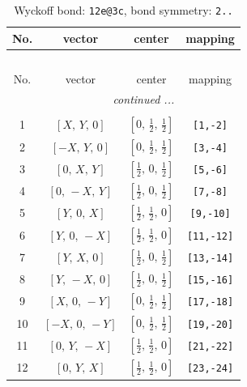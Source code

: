 \documentclass[fleqn,8pt]{jsarticle}
\begin{document}
\renewcommand{\arraystretch}{1.2}
\begin{longtable}{cccc}
\caption{Wyckoff bond: {\tt 12e@3c}, bond symmetry: {\tt 2..}}
 \\
 \hline \hline
No. & vector & center & mapping \\ \hline \endfirsthead

\multicolumn{3}{l}{\tablename\ \thetable{}} \\
 \hline \hline
No. & vector & center & mapping \\ \hline \endhead

 \hline \hline
\multicolumn{3}{r}{\footnotesize\it continued ...} \\ \endfoot

 \hline \hline
\multicolumn{3}{r}{} \\ \endlastfoot

1 & $\left[ X,\, Y,\, 0 \right]$ & $\left[ 0,\, \frac{1}{2},\, \frac{1}{2} \right]$ & {\tt [1,-2]} \\ \hline
2 & $\left[ - X,\, Y,\, 0 \right]$ & $\left[ 0,\, \frac{1}{2},\, \frac{1}{2} \right]$ & {\tt [3,-4]} \\ \hline
3 & $\left[ 0,\, X,\, Y \right]$ & $\left[ \frac{1}{2},\, 0,\, \frac{1}{2} \right]$ & {\tt [5,-6]} \\ \hline
4 & $\left[ 0,\, - X,\, Y \right]$ & $\left[ \frac{1}{2},\, 0,\, \frac{1}{2} \right]$ & {\tt [7,-8]} \\ \hline
5 & $\left[ Y,\, 0,\, X \right]$ & $\left[ \frac{1}{2},\, \frac{1}{2},\, 0 \right]$ & {\tt [9,-10]} \\ \hline
6 & $\left[ Y,\, 0,\, - X \right]$ & $\left[ \frac{1}{2},\, \frac{1}{2},\, 0 \right]$ & {\tt [11,-12]} \\ \hline
7 & $\left[ Y,\, X,\, 0 \right]$ & $\left[ \frac{1}{2},\, 0,\, \frac{1}{2} \right]$ & {\tt [13,-14]} \\ \hline
8 & $\left[ Y,\, - X,\, 0 \right]$ & $\left[ \frac{1}{2},\, 0,\, \frac{1}{2} \right]$ & {\tt [15,-16]} \\ \hline
9 & $\left[ X,\, 0,\, - Y \right]$ & $\left[ 0,\, \frac{1}{2},\, \frac{1}{2} \right]$ & {\tt [17,-18]} \\ \hline
10 & $\left[ - X,\, 0,\, - Y \right]$ & $\left[ 0,\, \frac{1}{2},\, \frac{1}{2} \right]$ & {\tt [19,-20]} \\ \hline
11 & $\left[ 0,\, Y,\, - X \right]$ & $\left[ \frac{1}{2},\, \frac{1}{2},\, 0 \right]$ & {\tt [21,-22]} \\ \hline
12 & $\left[ 0,\, Y,\, X \right]$ & $\left[ \frac{1}{2},\, \frac{1}{2},\, 0 \right]$ & {\tt [23,-24]} \\
\end{longtable}
\end{document}
